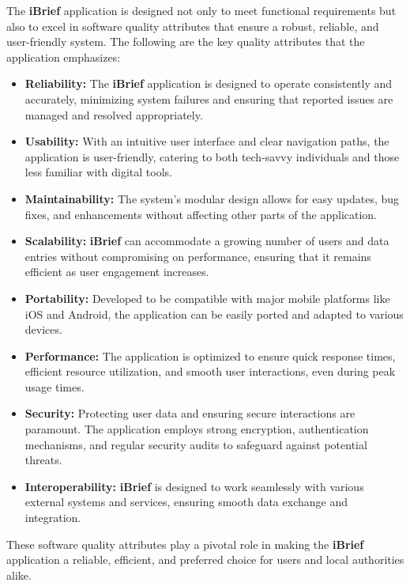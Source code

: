The \textbf{iBrief} application is designed not only to meet functional requirements but also to excel in software quality attributes that ensure a robust, reliable, and user-friendly system. The following are the key quality attributes that the application emphasizes:

\begin{itemize}
    \item \textbf{Reliability:} The \textbf{iBrief} application is designed to operate consistently and accurately, minimizing system failures and ensuring that reported issues are managed and resolved appropriately.

    \item \textbf{Usability:} With an intuitive user interface and clear navigation paths, the application is user-friendly, catering to both tech-savvy individuals and those less familiar with digital tools.

    \item \textbf{Maintainability:} The system's modular design allows for easy updates, bug fixes, and enhancements without affecting other parts of the application.

    \item \textbf{Scalability:} \textbf{iBrief} can accommodate a growing number of users and data entries without compromising on performance, ensuring that it remains efficient as user engagement increases.

    \item \textbf{Portability:} Developed to be compatible with major mobile platforms like \gls{iOS} and \gls{Android}, the application can be easily ported and adapted to various devices.

    \item \textbf{Performance:} The application is optimized to ensure quick response times, efficient resource utilization, and smooth user interactions, even during peak usage times.

    \item \textbf{Security:} Protecting user data and ensuring secure interactions are paramount. The application employs strong encryption, authentication mechanisms, and regular security audits to safeguard against potential threats.

    \item \textbf{Interoperability:} \textbf{iBrief} is designed to work seamlessly with various external systems and services, ensuring smooth data exchange and integration.

\end{itemize}

These software quality attributes play a pivotal role in making the \textbf{iBrief} application a reliable, efficient, and preferred choice for users and local authorities alike.

